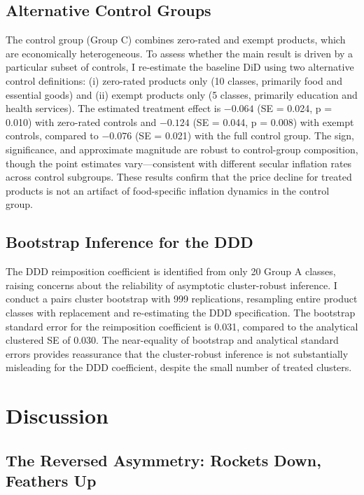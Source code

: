 \documentclass[12pt]{article}
\begin{document}
\subsection{Alternative Control Groups}

The control group (Group C) combines zero-rated and exempt products, which are economically heterogeneous. To assess whether the main result is driven by a particular subset of controls, I re-estimate the baseline DiD using two alternative control definitions: (i) zero-rated products only (10 classes, primarily food and essential goods) and (ii) exempt products only (5 classes, primarily education and health services). The estimated treatment effect is $-0.064$ (SE = 0.024, p = 0.010) with zero-rated controls and $-0.124$ (SE = 0.044, p = 0.008) with exempt controls, compared to $-0.076$ (SE = 0.021) with the full control group. The sign, significance, and approximate magnitude are robust to control-group composition, though the point estimates vary---consistent with different secular inflation rates across control subgroups. These results confirm that the price decline for treated products is not an artifact of food-specific inflation dynamics in the control group.

\subsection{Bootstrap Inference for the DDD}

The DDD reimposition coefficient is identified from only 20 Group A classes, raising concerns about the reliability of asymptotic cluster-robust inference. I conduct a pairs cluster bootstrap with 999 replications, resampling entire product classes with replacement and re-estimating the DDD specification. The bootstrap standard error for the reimposition coefficient is 0.031, compared to the analytical clustered SE of 0.030. The near-equality of bootstrap and analytical standard errors provides reassurance that the cluster-robust inference is not substantially misleading for the DDD coefficient, despite the small number of treated clusters.


\section{Discussion}

\subsection{The Reversed Asymmetry: Rockets Down, Feathers Up}
\end{document}
